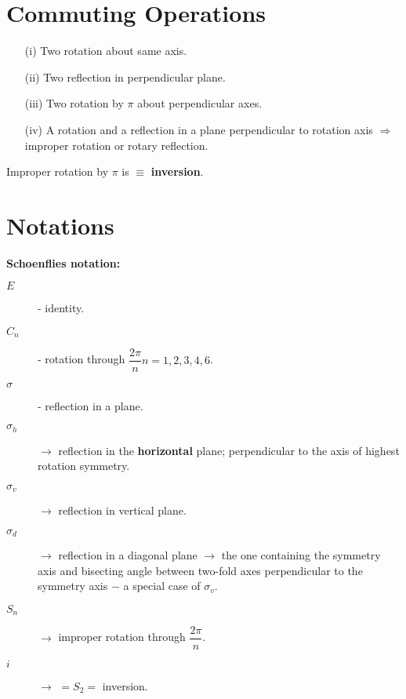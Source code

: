 \section*{Commuting Operations}
\begin{itemize}
\item[(i)] Two rotation about same axis.

\item[(ii)] Two reflection in perpendicular plane.

\item[(iii)] Two rotation by $\pi$ about perpendicular axes.

\item[(iv)] A rotation and a reflection in a plane perpendicular to rotation axis $\Rightarrow$ improper rotation or rotary reflection.
\end{itemize}
Improper rotation by $\pi$ is $\equiv$ {\bf inversion}.

\section*{Notations}

\noindent
{\bf Schoenflies notation:}
\begin{description}
\item[$E$] - identity.

\item[$C_{n}$] - rotation through $\dfrac{2\pi}{n}$\quad $n=1,2,3,4,6$.

\item[$\sigma$] - reflection in a plane.

\item[$\sigma_{h}$] $\to$ reflection in the {\bf horizontal} plane; perpendicular to the axis of highest rotation symmetry.

\item[$\sigma_{v}$] $\to$ reflection in vertical plane.

\item[$\sigma_{d}$] $\to$ reflection in a diagonal plane $\to$ the one containing the symmetry axis and bisecting angle between two-fold axes perpendicular to the symmetry axis $-$ a special case of $\sigma_{v}$.

\item[$S_{n}$] $\to$ improper rotation through $\dfrac{2\pi}{n}$.

\item[$i$] $\to$ $=S_{2}=$ inversion.
\end{description}

